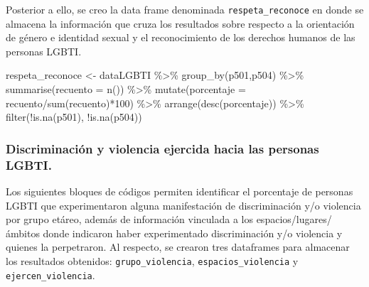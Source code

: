 \documentclass[
]{book}
\newenvironment{Shaded}{\begin{snugshade}}{\end{snugshade}}
\newcommand{\AttributeTok}[1]{\textcolor[rgb]{0.77,0.63,0.00}{#1}}
\newcommand{\DecValTok}[1]{\textcolor[rgb]{0.00,0.00,0.81}{#1}}
\newcommand{\FunctionTok}[1]{\textcolor[rgb]{0.00,0.00,0.00}{#1}}
\newcommand{\NormalTok}[1]{#1}
\newcommand{\OtherTok}[1]{\textcolor[rgb]{0.56,0.35,0.01}{#1}}
\newcommand{\SpecialCharTok}[1]{\textcolor[rgb]{0.00,0.00,0.00}{#1}}
\theoremstyle{definition}
\theoremstyle{definition}
\theoremstyle{definition}
\theoremstyle{definition}
\theoremstyle{remark}
\begin{document}
Posterior a ello, se creo la data frame denominada \texttt{respeta\_reconoce} en donde se almacena la información que cruza los resultados sobre respecto a la orientación de género e identidad sexual y el reconocimiento de los derechos humanos de las personas LGBTI.

\begin{Shaded}
\begin{Highlighting}[]
\NormalTok{respeta\_reconoce }\OtherTok{\textless{}{-}}\NormalTok{ dataLGBTI }\SpecialCharTok{\%\textgreater{}\%} 
  \FunctionTok{group\_by}\NormalTok{(p501,p504) }\SpecialCharTok{\%\textgreater{}\%} 
  \FunctionTok{summarise}\NormalTok{(}\AttributeTok{recuento =} \FunctionTok{n}\NormalTok{()) }\SpecialCharTok{\%\textgreater{}\%} 
  \FunctionTok{mutate}\NormalTok{(}\AttributeTok{porcentaje =}\NormalTok{ recuento}\SpecialCharTok{/}\FunctionTok{sum}\NormalTok{(recuento)}\SpecialCharTok{*}\DecValTok{100}\NormalTok{) }\SpecialCharTok{\%\textgreater{}\%} 
  \FunctionTok{arrange}\NormalTok{(}\FunctionTok{desc}\NormalTok{(porcentaje)) }\SpecialCharTok{\%\textgreater{}\%} 
  \FunctionTok{filter}\NormalTok{(}\SpecialCharTok{!}\FunctionTok{is.na}\NormalTok{(p501), }\SpecialCharTok{!}\FunctionTok{is.na}\NormalTok{(p504))}
\end{Highlighting}
\end{Shaded}

\hypertarget{discriminaciuxf3n-y-violencia-ejercida-hacia-las-personas-lgbti.}{%
\subsubsection{Discriminación y violencia ejercida hacia las personas LGBTI.}\label{discriminaciuxf3n-y-violencia-ejercida-hacia-las-personas-lgbti.}}

Los siguientes bloques de códigos permiten identificar el porcentaje de personas LGBTI que experimentaron alguna manifestación de discriminación y/o violencia por grupo etáreo, además de información vinculada a los espacios/lugares/ámbitos donde indicaron haber experimentado discriminación y/o violencia y quienes la perpetraron. Al respecto, se crearon tres dataframes para almacenar los resultados obtenidos: \texttt{grupo\_violencia}, \texttt{espacios\_violencia} y \texttt{ejercen\_violencia}.
\end{document}
